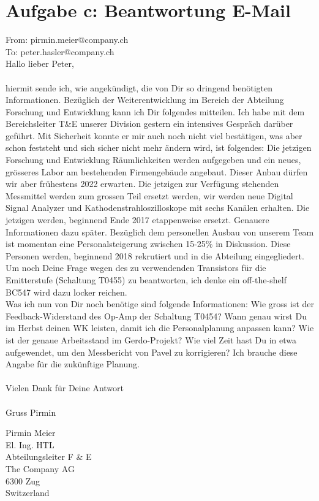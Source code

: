 \newpage
\section*{Aufgabe c: Beantwortung E-Mail}
From: pirmin.meier@company.ch\\
To: peter.hasler@company.ch\\

Hallo lieber Peter,\\\\
hiermit sende ich, wie angekündigt, die von Dir so dringend benötigten Informationen. 
Bezüglich der Weiterentwicklung im Bereich der Abteilung Forschung und Entwicklung kann ich Dir folgendes mitteilen. Ich habe mit dem Bereichsleiter T\&E unserer Division gestern ein intensives Gespräch darüber geführt. Mit Sicherheit konnte er mir auch noch nicht viel bestätigen, was aber schon feststeht und sich sicher nicht mehr ändern wird, ist folgendes: Die jetzigen Forschung und Entwicklung Räumlichkeiten werden aufgegeben und ein neues, grösseres Labor am bestehenden Firmengebäude angebaut. Dieser Anbau dürfen wir aber frühestens 2022 erwarten. Die jetzigen zur Verfügung stehenden Messmittel werden zum grossen Teil ersetzt werden, wir werden neue Digital Signal Analyzer und Kathodenstrahloszilloskope mit sechs Kanälen erhalten. Die jetzigen werden, beginnend Ende 2017 etappenweise ersetzt. Genauere Informationen dazu später. Bezüglich dem personellen Ausbau von unserem Team ist momentan eine Personalsteigerung zwischen 15-25\% in Diskussion. Diese Personen werden, beginnend 2018 rekrutiert und in die Abteilung eingegliedert.
Um noch Deine Frage wegen des zu verwendenden Transistors für die Emitterstufe (Schaltung T0455) zu beantworten, ich denke ein off-the-shelf BC547 wird dazu locker reichen. \\
Was ich nun von Dir noch benötige sind folgende Informationen:
Wie gross ist der Feedback-Widerstand des Op-Amp der Schaltung T0454?
Wann genau wirst Du im Herbst deinen WK leisten, damit ich die Personalplanung anpassen kann?
Wie ist der genaue Arbeitsstand im Gerdo-Projekt?
Wie viel Zeit hast Du in etwa aufgewendet, um den Messbericht von Pavel zu korrigieren? Ich brauche diese Angabe für die zukünftige Planung.\\\\
Vielen Dank für Deine Antwort\\\\
Gruss Pirmin

Pirmin Meier\\
El. Ing. HTL\\
Abteilungsleiter F \& E\\
The Company AG\\
6300 Zug\\
Switzerland
   